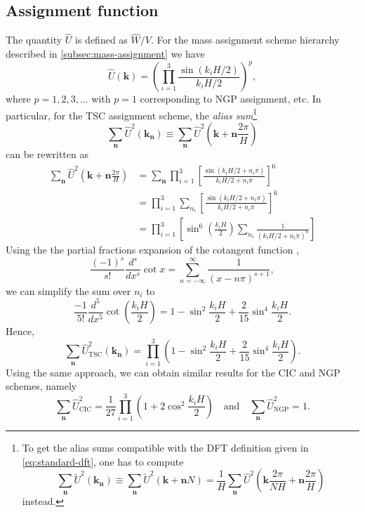 \subsection{Assignment function}
The quantity $\hat{U}$ is defined as $\hat{W}/V$.
For the mass assignment scheme hierarchy described in \autoref{subsec:mass-assignment} we have
\begin{equation*}
    \hat{U}(\mathbf{k}) = \left(\prod_{i=1}^{3}\frac{\sin(k_i H / 2)}{k_i H / 2}\right)^{p},
\end{equation*}
where $p=1,2,3,\dots$ with $p=1$ corresponding to NGP assignment, etc.
In particular, for the TSC assignment scheme, the \textit{alias sum}\footnote{
    To get the alias sums compatible with the DFT definition given in \autoref{eq:standard-dft}, one has to compute
    \begin{equation*}
        \sum_{\mathbf{n}} \tilde{U}^2(\mathbf{k}_\mathbf{n})
        \equiv \sum_\mathbf{n}\tilde{U}^2(\mathbf{k}+\mathbf{n}N)
        = \frac{1}{H}\sum_\mathbf{n}\hat{U}^2\left(\mathbf{k}\frac{2\pi}{NH}+\mathbf{n}\frac{2\pi}{H}\right)
    \end{equation*}
    instead.
}
\begin{equation*}
    \sum_{\mathbf{n}}\hat{U}^2(\mathbf{k}_\mathbf{n})
    \equiv \sum_{\mathbf{n}}\hat{U}^2\left(\mathbf{k} + \mathbf{n}\frac{2\pi}{H}\right)
\end{equation*}
can be rewritten as
\begin{align*}
    \sum_{\mathbf{n}} \hat{U}^2\left(\mathbf{k}+\mathbf{n}\frac{2\pi}{H}\right)
     & = \sum_{\mathbf{n}} \prod_{i=1}^{3} \left[ \frac{\sin(k_i H/2 + n_i\pi)}{k_i H/2 + n_i\pi} \right]^6 \\
     & = \prod_{i=1}^{3} \sum_{n_i} \left[ \frac{\sin(k_i H/2 + n_i \pi)}{k_i H/2 + n_i \pi} \right]^6      \\
     & = \prod_{i=1}^{3} \left[ \sin^6\left(\frac{k_i H}{2}\right)
        \sum_{n_i} \frac{1}{(k_i H/2 + n_i \pi)^6} \right]
\end{align*}
Using the the partial fractions expansion of the cotangent function \cite{aigner2018proofs},
\begin{equation*}
    \frac{(-1)^s}{s!}\frac{d^s}{dx^s}\cot x = \sum_{n=-\infty}^{\infty} \frac{1}{(x-n\pi)^{s+1}},
\end{equation*}
we can simplify the sum over $n_i$ to
\begin{equation*}
    \frac{-1}{5!} \frac{d^5}{dx^5}\cot\left( \frac{k_i H}{2} \right)
    = 1 - \sin^2\frac{k_i H}{2} + \frac{2}{15}\sin^4\frac{k_i H}{2}.
\end{equation*}
Hence,
\begin{equation*}
    \sum_{\mathbf{n}}\hat{U}_\text{TSC}^2(\mathbf{k}_\mathbf{n})
    = \prod_{i=1}^{3} \left(1 - \sin^2\frac{k_i H}{2} + \frac{2}{15}\sin^4\frac{k_i H}{2}\right).
\end{equation*}
Using the same approach, we can obtain similar results for the CIC and NGP schemes, namely
\begin{equation*}
    \sum_{\mathbf{n}}\hat{U}_\text{CIC}^2 = \frac{1}{27} \prod_{i=1}^{3} \left(1 + 2\cos^2\frac{k_i H}{2}\right)
    \quad \text{and} \quad
    \sum_{\mathbf{n}}\hat{U}_\text{NGP}^2 = 1.
\end{equation*}

